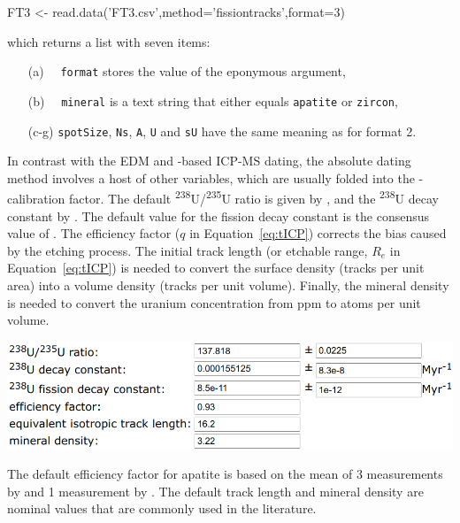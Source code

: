 \begin{refsection}
\begin{enumerate}
\begin{console}
FT3 <- read.data('FT3.csv',method='fissiontracks',format=3)
\end{console}

\noindent which returns a list with seven items:

\begin{enumerate}[leftmargin=\parindent,align=left]
\item[(a)~~]\texttt{format} stores the value of the eponymous argument,
\item[(b)~~]\texttt{mineral} is a text string that either equals
  \texttt{apatite} or \texttt{zircon},
\item[(c-g)]\texttt{spotSize}, \texttt{Ns}, \texttt{A},
  \texttt{U} and \texttt{sU} have the same meaning as for format 2.
\end{enumerate}

In contrast with the EDM and \textzeta-based ICP-MS dating, the
absolute dating method involves a host of other variables, which are
usually folded into the \textzeta-calibration factor. The default
\textsuperscript{238}U/\textsuperscript{235}U ratio is given by
\citet{hiess2012}, and the \textsuperscript{238}U decay constant by
\citet{jaffey1971}. The default value for the fission decay constant
is the consensus value of \citet{holden2000}.  The efficiency factor
($q$ in Equation~\ref{eq:tICP}) corrects the bias caused by the
etching process. The initial track length (or etchable range, $R_e$ in
Equation~\ref{eq:tICP}) is needed to convert the surface density
(tracks per unit area) into a volume density (tracks per unit
volume). Finally, the mineral density is needed to convert the uranium
concentration from ppm to atoms per unit volume.

\begin{center}
\includegraphics[width=.8\linewidth]{../figures/FTlambda.png}
\end{center}

The default efficiency factor for apatite is based on the mean of 3
measurements by \citet{iwano1998} and 1 measurement by
\citet{jonckheere2003b}. The default track length and mineral density
are nominal values that are commonly used in the literature.


\end{enumerate}
\end{refsection}
